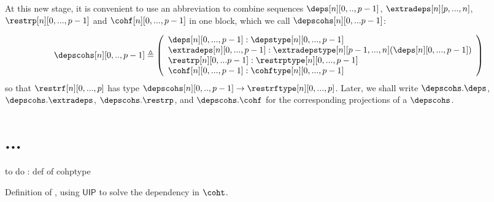 \documentclass{msc}
\newcommand{\defeq}{\ensuremath{\triangleq}}
\newcommand{\UIP}{\textsf{UIP}}
\begin{document}
At this new stage, it is convenient to use an abbreviation to combine sequences $\deps[n][0,..,p-1]$, $\extradeps[n][p,...,n]$, $\restrp[n][0,...,p-1]$ and $\cohf[n][0,...,p-1]$ in one block, which we call $\depscohs[n][0,...p-1]$:

\begin{align*}
  \depscohs[n][0,..,p-1] \defeq
  \left(\begin{array}{l}
            \deps[n][0,...,p-1] :\depstype[n][0,...,p-1]    \\
            \extradeps[n][0,...,p-1] :\extradepstype[n][p-1,...,n]
            (\deps[n][0,...,p-1])                           \\
            \restrp[n][0,...p-1]: \restrptype[n][0,...,p-1] \\
            \cohf[n][0,...,p-1]: \cohftype[n][0,...,p-1]    \\
          \end{array}\right)
\end{align*}
so that $\restrf[n][0,...,p]$ has type $\depscohs[n][0,..,p-1] \rightarrow \restrftype[n][0,...,p]$. Later, we shall write $\depscohs.\deps$, $\depscohs.\extradeps$, $\depscohs.\restrp$, and $\depscohs.\cohf$ for the corresponding projections of a $\depscohs$.

\section{...}

to do : def of cohptype

Definition of \cohf, using $\UIP$ to solve the dependency in $\coht$.
\end{document}
